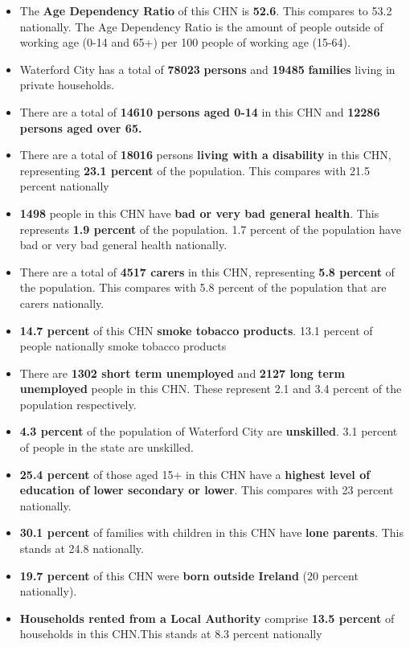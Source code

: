 \documentclass{article}
\begin{document}
\begin{itemize}

\item The \textbf{Age Dependency Ratio} of this CHN is  \textbf{52.6}. This compares to 53.2 nationally. The Age Dependency Ratio is the amount of people outside of working age (0-14 and 65+) per 100 people of working age (15-64). 

\item Waterford City has a total of \textbf{\num{78023}} \textbf{persons} and  \textbf{\num{19485}} \textbf{families} living in private households.

\item There are a total of \textbf{\num{14610} persons aged 0-14} in this CHN and \textbf{\num{12286} persons aged over 65.} 

\item There are a total of \textbf{\num{18016}} persons \textbf{living with a disability} in this CHN, representing \textbf{23.1 percent} of the population. This compares with  21.5 percent nationally

\item \textbf{\num{1498}} people in this CHN have \textbf{bad or very bad general health}. This represents \textbf{1.9 percent} of the population. 1.7 percent of the population have bad or very bad general health nationally. 

\item There are a total of \textbf{\num{4517} carers} in this CHN, representing \textbf{5.8 percent} of the population. This compares with 5.8 percent of the population that are carers nationally. 

\item \textbf{14.7 percent} of this CHN \textbf{smoke tobacco products}. 13.1 percent of people nationally smoke tobacco products

\item There are \textbf{\num{1302} short term unemployed} and \textbf{\num{2127} long term unemployed} people in this CHN. These represent 2.1 and 3.4 percent of the population respectively.

\item  \textbf{4.3 percent} of the population of Waterford City are \textbf{unskilled}. 3.1 percent of people in the state are unskilled.

\item \textbf{25.4 percent} of those aged 15+ in this CHN have a \textbf{highest level of education of lower secondary or lower}. This compares with 23 percent nationally. 

\item \textbf{30.1 percent} of families with children in this CHN have \textbf{lone parents}. This stands at 24.8 nationally.

\item \textbf{19.7 percent} of this CHN were \textbf{born outside Ireland} (20 percent nationally).

\item \textbf{Households rented from a Local Authority} comprise \textbf{13.5 percent} of households in this CHN.This stands at 8.3 percent nationally

\end{itemize}
\end{document}
